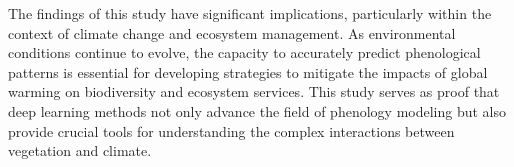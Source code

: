 \documentclass[pdflatex,sn-mathphys-num]{sn-jnl}%
\theoremstyle{thmstyleone}%
\theoremstyle{thmstyletwo}%
\theoremstyle{thmstylethree}%
\begin{document}
The findings of this study have significant implications, particularly within the context of climate change and ecosystem management. As environmental conditions continue to evolve, the capacity to accurately predict phenological patterns is essential for developing strategies to mitigate the impacts of global warming on biodiversity and ecosystem services. This study serves as proof that deep learning methods not only advance the field of phenology modeling but also provide crucial tools for understanding the complex interactions between vegetation and climate.


\end{document}
